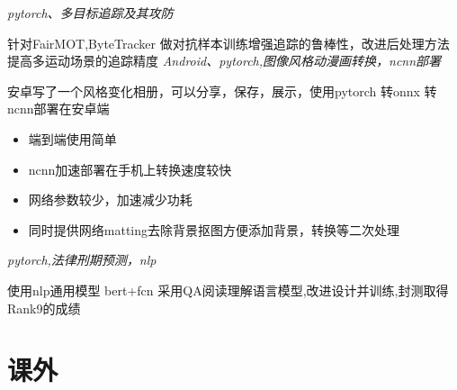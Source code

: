 \documentclass{uniquecv}
\begin{document}
\textit{pytorch、多目标追踪及其攻防}
\vspace{0.4ex}

针对FairMOT,ByteTracker 做对抗样本训练增强追踪的鲁棒性，改进后处理方法提高多运动场景的追踪精度
\textit{Android、pytorch,图像风格动漫画转换，ncnn部署}
\vspace{0.4ex}

安卓写了一个风格变化相册，可以分享，保存，展示，使用pytorch 转onnx 转 ncnn部署在安卓端
\begin{itemize}
  \item 端到端使用简单
  \item ncnn加速部署在手机上转换速度较快
  \item 网络参数较少，加速减少功耗
  \item 同时提供网络matting去除背景抠图方便添加背景，转换等二次处理
\end{itemize}
\textit{pytorch,法律刑期预测，nlp}
\vspace{0.4ex}

使用nlp通用模型 bert+fcn 采用QA阅读理解语言模型,改进设计并训练,封测取得Rank9的成绩

\section{课外}
\end{document}
